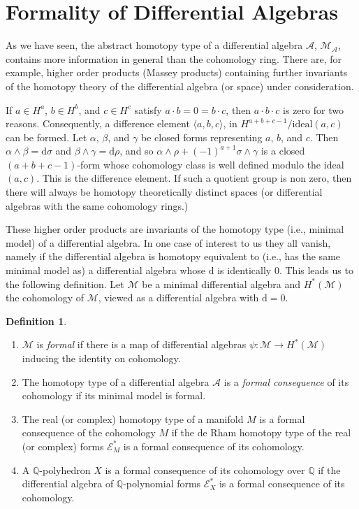 \documentclass[11pt]{amsart}
\theoremstyle{plain}
\theoremstyle{definition}
\newtheorem{definition}[theorem]{Definition}
\newcommand{\sA}{\mathscr{A}}
\newcommand{\sE}{\mathscr{E}}
\newcommand{\cM}{\mathcal{M}}
\newcommand{\dd}{\mathrm{d}}
\newcommand{\QQ}{\mathbb{Q}}
\begin{document}
\section{Formality of Differential Algebras}

As we have seen, the abstract homotopy type of a differential algebra $\sA$, $\cM_{\sA}$, contains more information in general than the cohomology ring. There are, for example, higher order products (Massey products) containing further invariants of the homotopy theory of the differential algebra (or space) under consideration.

If $a \in H^{a}$, $b \in H^{b}$, and $c \in H^{c}$ satisfy $a \cdot b = 0 = b \cdot c$, then $a \cdot b \cdot c$ is zero for two reasons. Consequently, a difference element $\langle a, b, c \rangle$, in $H^{a+b+c-1}/\text{ideal}(a, c)$ can be formed. Let $\alpha$, $\beta$, and $\gamma$ be closed forms representing $a$, $b$, and $c$. Then $\alpha \wedge \beta = \dd\sigma$ and $\beta \wedge \gamma = \dd\rho$, and so $\alpha \wedge \rho + (-1)^{a+1} \sigma \wedge \gamma$ is a closed $(a+b+c-1)$-form whose cohomology class is well defined modulo the ideal $(a, c)$. This is the difference element. If such a quotient group is non zero, then there will always be homotopy theoretically distinct spaces (or differential algebras with the same cohomology rings.)

These higher order products are invariants of the homotopy type (i.e., minimal model) of a differential algebra. In one case of interest to us they all vanish, namely if the differential algebra is homotopy equivalent to (i.e., has the same minimal model as) a differential algebra whose $\dd$ is identically $0$. This leads us to the following definition. Let $\cM$ be a minimal differential algebra and $H^{*}(\cM)$ the cohomology of $\cM$, viewed as a differential algebra with $\dd = 0$.

\begin{definition}%
\begin{enumerate}
\item[(i)] $\cM$ is \emph{formal} if there is a map of differential algebras $\psi \colon \cM \to H^{*}(\cM)$ inducing the identity on cohomology.
\item[(ii)] The homotopy type of a differential algebra $\sA$ is a \emph{formal consequence} of its cohomology if its minimal model is formal.
\item[(iii)] The real (or complex) homotopy type of a manifold $M$ is a formal consequence of the cohomology $M$ if the de Rham homotopy type of the real (or complex) forms $\sE^{*}_{M}$ is a formal consequence of its cohomology.
\item[(iv)] A $\QQ$-polyhedron $X$ is a formal consequence of its cohomology over $\QQ$ if the differential algebra of $\QQ$-polynomial forms $\sE^{*}_{X}$ is a formal consequence of its cohomology.
\end{enumerate}
\end{definition}
\end{document}
